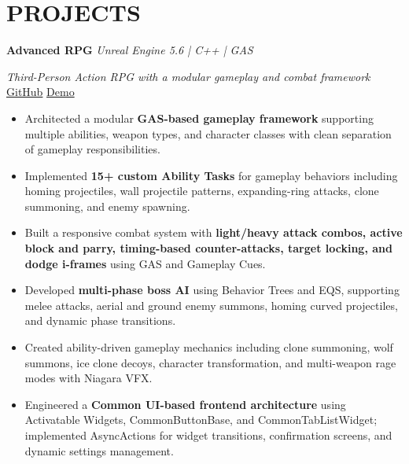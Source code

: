\documentclass[10pt,letterpaper]{article}
\begin{document}

\section{PROJECTS}

\textbf{Advanced RPG}
\hfill
\textit{Unreal Engine 5.6 \;|\; C++ \;|\; GAS}

\vspace{1pt}

\textit{Third-Person Action RPG with a modular gameplay and combat framework}
\hfill
\href{https://github.com/Praveen703639/Advanced-RPG}{GitHub}
\quad
\href{https://www.youtube.com/watch?v=sfk2eV6xraI}{Demo}

\vspace{1pt}

\begin{itemize}

    \item
    Architected a modular \textbf{GAS-based gameplay framework} supporting
    multiple abilities, weapon types, and character classes with clean
    separation of gameplay responsibilities.

    \item
    Implemented \textbf{15+ custom Ability Tasks} for gameplay behaviors
    including homing projectiles, wall projectile patterns, expanding-ring
    attacks, clone summoning, and enemy spawning.

    \item
    Built a responsive combat system with \textbf{light/heavy attack combos,
    active block and parry, timing-based counter-attacks, target locking,
    and dodge i-frames} using GAS and Gameplay Cues.

    \item
    Developed \textbf{multi-phase boss AI} using Behavior Trees and EQS,
    supporting melee attacks, aerial and ground enemy summons, homing
    curved projectiles, and dynamic phase transitions.

    \item
    Created ability-driven gameplay mechanics including clone summoning,
    wolf summons, ice clone decoys, character transformation, and
    multi-weapon rage modes with Niagara VFX.

    \item
    Engineered a \textbf{Common UI-based frontend architecture} using
    Activatable Widgets, CommonButtonBase, and CommonTabListWidget;
    implemented AsyncActions for widget transitions, confirmation screens,
    and dynamic settings management.

\end{itemize}
\end{document}
